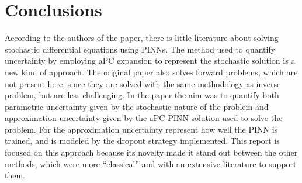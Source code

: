 \documentclass[11pt,a4paper]{article}
\begin{document}
\section{Conclusions}

According to the authors of the paper, there is little literature about solving stochastic differential equations using PINNs. The method used to quantify uncertainty by employing aPC expansion to represent the stochastic solution is a new kind of approach. The original paper also solves forward problems, which are not present here, since they are solved with the same methodology as inverse problem, but are less challenging. In the paper the aim was to quantify both parametric uncertainty given by the stochastic nature of the problem and approximation uncertainty given by the aPC-PINN solution used to solve the problem. For the approximation uncertainty represent how well the PINN is trained, and is modeled by the dropout strategy implemented. This report is focused on this approach because its novelty made it stand out between the other methods, which were more ``classical'' and with an extensive literature to support them.




\end{document}
